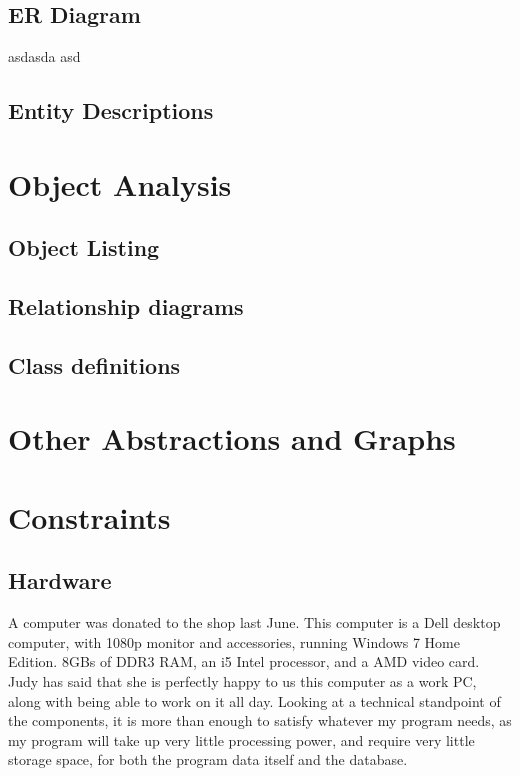 \subsection{ER Diagram}
asdasda asd
\subsection{Entity Descriptions}

\section{Object Analysis}

\subsection{Object Listing}

\subsection{Relationship diagrams}

\subsection{Class definitions}

\section{Other Abstractions and Graphs}

\section{Constraints}

\subsection{Hardware}
A computer was donated to the shop last June. This computer is a Dell desktop computer, with 1080p monitor and accessories, running Windows 7 Home Edition. 8GBs of DDR3 RAM, an i5 Intel processor, and a AMD video card. Judy has said that she is perfectly happy to us this computer as a work PC, along with being able to work on it all day. Looking at a technical standpoint of the components, it is more than enough to satisfy whatever my program needs, as my program will take up very little processing power, and require very little storage space, for both the program data itself and the database.

